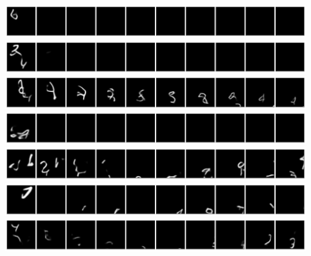 
\newpage
\begin{center}
    \includegraphics[width=\linewidth]{figures/SQAIR/vrnn_samples/000002.png}
    \includegraphics[width=\linewidth]{figures/SQAIR/vrnn_samples/000004.png}
    \includegraphics[width=\linewidth]{figures/SQAIR/vrnn_samples/000007.png}
    \includegraphics[width=\linewidth]{figures/SQAIR/vrnn_samples/000009.png}
    \includegraphics[width=\linewidth]{figures/SQAIR/vrnn_samples/000012.png}
    \includegraphics[width=\linewidth]{figures/SQAIR/vrnn_samples/000013.png}
    \includegraphics[width=\linewidth]{figures/SQAIR/vrnn_samples/000016.png}

\end{center}
